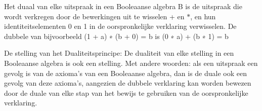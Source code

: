 \documentclass{article}
\begin{document}
	Het duaal van elke uitspraak in een Booleaanse algebra B is de uitspraak die wordt verkregen door de bewerkingen uit te wisselen
	+ en $\ast$, en hun identiteitselementen 0 en 1 in de oorspronkelijke verklaring verwisselen. De dubbele van bijvoorbeeld
	(1 + a) ∗ (b + 0) = b is (0 ∗ a) + (b ∗ 1) = b

	De stelling van het Dualiteitsprincipe: De dualiteit van elke stelling in een Booleaanse algebra is ook een stelling.
	Met andere woorden: als een uitspraak een gevolg is van de axioma's van een Booleaanse algebra, dan is de duale ook een 	gevolg van deze axioma's, aangezien de dubbele verklaring kan worden bewezen door de duale van elke stap van het bewijs te gebruiken 	van de oorspronkelijke verklaring.
	
	
	
\end{document}

